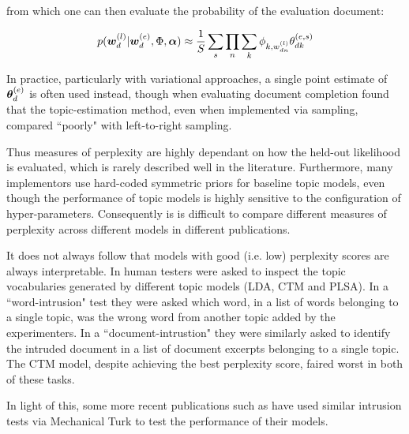 from which one can then evaluate the probability of the evaluation document:

\begin{align}
p(\bm w_d^{(l)}|\bm w_d^{(e)}, \Phi, \bm \alpha) \approx
\frac{1}{ {S} } \sum_s \prod_n \sum_k \phi_{k,w^{(l)}_{dn}}\theta_{dk}^{(e,s)}
\end{align}

In practice, particularly with variational approaches, a single point estimate of $\bm \theta_d^{(e)}$ is often used instead\cite{Asuncion2012}, though when evaluating document completion \cite{Wallach2009} found that the topic-estimation method, even when implemented via sampling, compared ``poorly" with left-to-right sampling. 

Thus measures of perplexity are highly dependant on how the held-out likelihood is evaluated, which is rarely described well in the literature. Furthermore, many implementors use hard-coded symmetric priors for baseline topic models, even though the performance of topic models is highly sensitive to the configuration of hyper-parameters\cite{Asuncion2012}\cite{Wallach2006}. Consequently is is difficult to compare different measures of perplexity across different models in different publications.

It does not always follow that models with good (i.e. low) perplexity scores are always interpretable. In\cite{Chang2009} human testers were asked to inspect the topic vocabularies generated by different topic models (LDA, CTM and PLSA). In a ``word-intrusion" test they were asked which word, in a list of words belonging to a single topic, was the wrong word from another topic added by the experimenters. In a ``document-intrustion" they were similarly asked to identify the intruded document in a list of document excerpts belonging to a single topic. The CTM model, despite achieving the best perplexity score, faired worst in both of these tasks. 


In light of this, some more recent publications such as \cite{Li2006}\cite{Wang2007}\cite{Lindsey2012} have used similar intrusion tests via Mechanical Turk to test the performance of their models.

